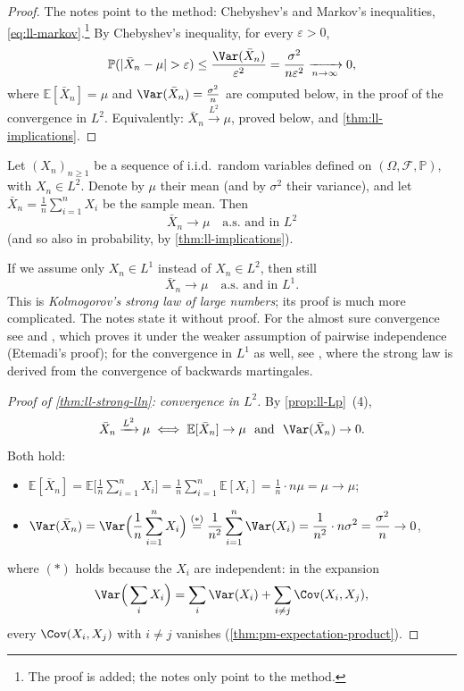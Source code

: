 \begin{proof}
The notes point to the method: Chebyshev's and Markov's inequalities,
\eqref{eq:ll-markov}.\footnote{The proof is added; the notes only point to the method.} By
Chebyshev's inequality, for every $\varepsilon>0$,
\begin{equation}\label{eq:ll-chebyshev-mean}
  \mathbb P(|\bar X_n-\mu|>\varepsilon)\le\frac{\Var(\bar X_n)}{\varepsilon^2}
  =\frac{\sigma^2}{n\varepsilon^2}\xrightarrow[n\to\infty]{}0,
\end{equation}
where $\mathbb E[\bar X_n]=\mu$ and $\Var(\bar X_n)=\frac{\sigma^2}n$ are computed below, in the
proof of the convergence in $L^2$. Equivalently: $\bar X_n\xrightarrow{L^2}\mu$, proved below, and
\cref{thm:ll-implications}.
\end{proof}

\begin{theorem}\label{thm:ll-strong-lln}
Let $(X_n)_{n\ge1}$ be a sequence of i.i.d.\ random variables defined on
$(\Omega,\mathcal F,\mathbb P)$, with $X_n\in L^2$. Denote by $\mu$ their mean (and by $\sigma^2$
their variance), and let $\bar X_n=\frac1n\sum_{i=1}^nX_i$ be the sample mean. Then
\[
  \bar X_n\to\mu\quad\text{a.s.\ and in }L^2
\]
(and so also in probability, by \cref{thm:ll-implications}).
\end{theorem}

\begin{remark}\label{rem:ll-kolmogorov}
If we assume only $X_n\in L^1$ instead of $X_n\in L^2$, then still
\[
  \bar X_n\to\mu\quad\text{a.s.\ and in }L^1 .
\]
This is \emph{Kolmogorov's strong law of large numbers}; its proof is much more complicated. The
notes state it without proof. For the almost sure convergence see \citet[Section~22]{billingsley}
and \citet[Section~2.4]{durrett}, which proves it under the weaker assumption of pairwise
independence (Etemadi's proof); for the convergence in $L^1$ as well, see
\citet[Section~4.7]{durrett}, where the strong law is derived from the convergence of backwards
martingales.
\end{remark}

\begin{proof}[Proof of \cref{thm:ll-strong-lln}: convergence in $L^2$]
By \cref{prop:ll-Lp}~(4),
\[
  \bar X_n\xrightarrow{L^2}\mu\iff\mathbb E[\bar X_n]\to\mu\ \text{ and }\ \Var(\bar X_n)\to0 .
\]
Both hold:
\begin{itemize}
  \item $\displaystyle\mathbb E[\bar X_n]=\mathbb E\Big[\frac1n\sum_{i=1}^nX_i\Big]
    =\frac1n\sum_{i=1}^n\mathbb E[X_i]=\frac1n\cdot n\mu=\mu\to\mu$;
  \item $\displaystyle\Var(\bar X_n)=\Var\Big(\frac1n\sum_{i=1}^nX_i\Big)
    \overset{(\ast)}{=}\frac1{n^2}\sum_{i=1}^n\Var(X_i)=\frac1{n^2}\cdot n\sigma^2
    =\frac{\sigma^2}n\to0$,
\end{itemize}
where $(\ast)$ holds because the $X_i$ are independent: in the expansion
\[
  \Var\Big(\sum_iX_i\Big)=\sum_i\Var(X_i)+\sum_{i\ne j}\Cov(X_i,X_j),
\]
every $\Cov(X_i,X_j)$ with $i\ne j$ vanishes (\cref{thm:pm-expectation-product}).
\end{proof}

